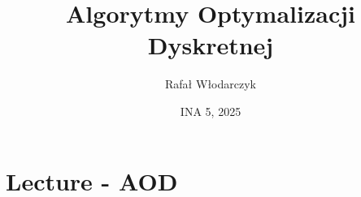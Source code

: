 \documentclass{article}
\title{Algorytmy Optymalizacji Dyskretnej}
\author{Rafał Włodarczyk}
\date{INA 5, 2025}
\numberwithin{equation}{subsection}
\begin{document}
\maketitle

\tableofcontents

\newpage

\section{Lecture - AOD}
\end{document}

